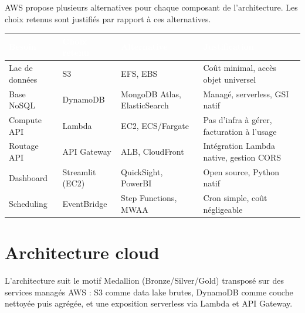 \documentclass[11pt]{article}
\newcommand{\thead}[1]{\textbf{\textcolor{white}{#1}}}
\begin{document}
AWS propose plusieurs alternatives pour chaque composant de l'architecture. Les
choix retenus sont justifiés par rapport à ces alternatives.

\begin{center}\begin{tabularx}{\linewidth}{|l|l|l|>{\raggedright\arraybackslash}X|}
\hline
\rowcolor{tableHeader}
\thead{Besoin} & \thead{Choix retenu} & \thead{Alternative} & \thead{Justification} \\
\hline
Lac de données & S3 & EFS, EBS & Coût minimal, accès objet universel \\
\hline
Base NoSQL & DynamoDB & MongoDB Atlas, ElasticSearch & Managé, serverless, GSI natif \\
\hline
Compute API & Lambda & EC2, ECS/Fargate & Pas d'infra à gérer, facturation à l'usage \\
\hline
Routage API & API Gateway & ALB, CloudFront & Intégration Lambda native, gestion CORS \\
\hline
Dashboard & Streamlit (EC2) & QuickSight, PowerBI & Open source, Python natif \\
\hline
Scheduling & EventBridge & Step Functions, MWAA & Cron simple, coût négligeable \\
\hline
\end{tabularx}\end{center}

\section{Architecture cloud}

L'architecture suit le motif Medallion (Bronze/Silver/Gold) transposé sur des
services managés AWS : S3 comme data lake brutes, DynamoDB comme couche
nettoyée puis agrégée, et une exposition serverless via Lambda et API Gateway.
\end{document}
